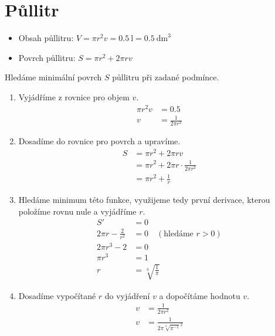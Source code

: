 \section{Půllitr}

\begin{itemize}
    \item Obsah půllitru: \( V = \pi r^2 v = 0.5 \ \mathrm{l} = 0.5 \ \mathrm{dm}^3 \)
    \item Povrch půllitru: \( S = \pi r^2 + 2 \pi r v \)
\end{itemize}

Hledáme minimální povrch \( S \) půllitru při zadané podmínce.

\begin{enumerate}
    \item Vyjádříme z rovnice pro objem \( v \).
    \begin{align*}
        \pi r^2 v &= 0.5 \\
        v &= \frac{1}{2 \pi r^2}
    \end{align*}

    \item Dosadíme do rovnice pro povrch a upravíme.
    \begin{align*}
        S & = \pi r^2 + 2 \pi r v \\
        & = \pi r^2 + 2 \pi r \cdot \frac{1}{2 \pi r^2} \\
        & = \pi r^2 + \frac{1}{r}
    \end{align*}

    \item Hledáme minimum této funkce, využijeme tedy první derivace, kterou položíme rovnu nule a vyjádříme \( r \).
    \begin{align*}
        S' & = 0 \\
        2 \pi r - \frac{2}{r^2} & = 0 \quad (\text{hledáme } r > 0) \\
        2 \pi r^3 - 2 & = 0 \\
        \pi r^3 & = 1 \\
        r & = \sqrt[3]{\frac{1}{\pi}}
    \end{align*}

    \item Dosadíme vypočítané \( r \) do vyjádření \( v \) a dopočítáme hodnotu \( v \).
    \begin{align*}
        v & = \frac{1}{2 \pi r^2} \\
        v & = \frac{1}{2 \pi \sqrt[3]{\pi^{-1}}^2}
    \end{align*}
\end{enumerate}

